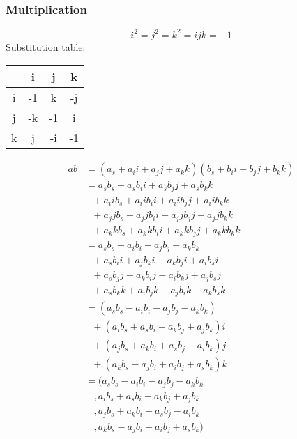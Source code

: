 \documentclass{article}
\begin{document}
\subsubsection{Multiplication}
$$ i^2 = j^2 = k^2 = ijk = -1 $$
Substitution table:
\begin{tabular}{ |c|c|c|c| }
    \hline
      & i  & j  & k \\
    \hline
    i & -1 & k  & -j \\
    \hline
    j & -k & -1 & i \\
    \hline
    k & j  & -i & -1 \\
    \hline
\end{tabular}
\begin{equation}
\begin{split}
ab & = (a_{s} + a_{i}i + a_{j}j + a_{k}k)(b_{s} + b_{i}i + b_{j}j + b_{k}k) \\
    & = a_{s}b_{s} + a_{s}b_{i}i + a_{s}b_{j}j + a_{s}b_{k}k \\
    & \ \ \ + a_{i}ib_{s} + a_{i}ib_{i}i + a_{i}ib_{j}j + a_{i}ib_{k}k \\
    & \ \ \ + a_{j}jb_{s} + a_{j}jb_{i}i + a_{j}jb_{j}j + a_{j}jb_{k}k \\
    & \ \ \ + a_{k}kb_{s} + a_{k}kb_{i}i + a_{k}kb_{j}j + a_{k}kb_{k}k \\
    & = a_{s}b_{s} - a_{i}b_{i} - a_{j}b_{j} - a_{k}b_{k} \\
    & \ \ \ + a_{s}b_{i}i + a_{j}b_{k}i - a_{k}b_{j}i + a_{i}b_{s}i \\
    & \ \ \ + a_{s}b_{j}j + a_{k}b_{i}j - a_{i}b_{k}j + a_{j}b_{s}j \\
    & \ \ \ + a_{s}b_{k}k + a_{i}b_{j}k - a_{j}b_{i}k + a_{k}b_{s}k \\
    & = (a_{s}b_{s} - a_{i}b_{i} - a_{j}b_{j} - a_{k}b_{k}) \\
    & \ \ \ + (a_{i}b_{s} + a_{s}b_{i} - a_{k}b_{j} + a_{j}b_{k})i \\
    & \ \ \ + (a_{j}b_{s} + a_{k}b_{i} + a_{s}b_{j} - a_{i}b_{k})j \\
    & \ \ \ + (a_{k}b_{s} - a_{j}b_{i} + a_{i}b_{j} + a_{s}b_{k})k \\
    & = (a_{s}b_{s} - a_{i}b_{i} - a_{j}b_{j} - a_{k}b_{k} \\
    & \ \ \ \ , a_{i}b_{s} + a_{s}b_{i} - a_{k}b_{j} + a_{j}b_{k} \\
    & \ \ \ \ , a_{j}b_{s} + a_{k}b_{i} + a_{s}b_{j} - a_{i}b_{k} \\
    & \ \ \ \ , a_{k}b_{s} - a_{j}b_{i} + a_{i}b_{j} + a_{s}b_{k})
\end{split}
\end{equation}
\end{document}
